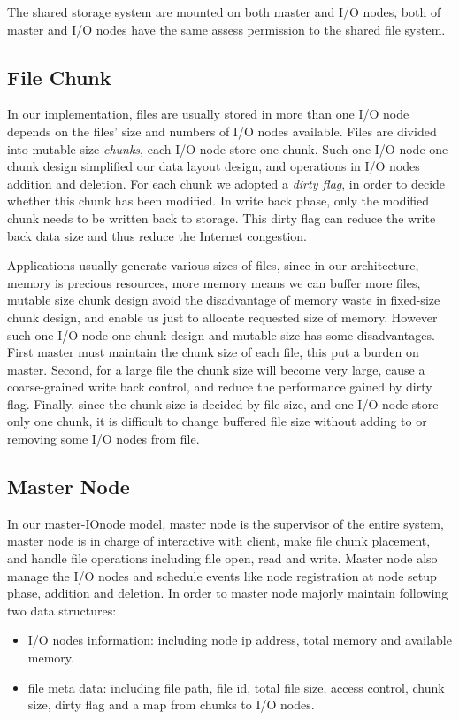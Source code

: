 The shared storage system are mounted on both master and I/O nodes, both of master and I/O nodes
have the same assess permission to the shared file system.

\subsection{File Chunk}
In our implementation, files are usually stored in more than one I/O node depends on the files'
size and numbers of I/O nodes available.
Files are divided into mutable-size \emph{chunks}, each I/O node store one chunk.
Such one I/O node one chunk design simplified our data layout design, and operations in I/O nodes addition and deletion.
For each chunk we adopted a \emph{dirty flag}, in order to decide whether this chunk has been modified.
In write back phase, only the modified chunk needs to be written back to storage.
This dirty flag can reduce the write back data size and thus reduce the Internet congestion.

Applications usually generate various sizes of files, since in our architecture, memory is precious
resources, more memory means we can buffer more files, mutable size chunk design avoid the
disadvantage of memory waste in fixed-size chunk design, and enable us just to allocate requested size of memory.
However such one I/O node one chunk design and mutable size has some disadvantages.
First master must maintain the chunk size of each file, this put a burden on master.
Second, for a large file the chunk size will become very large, cause a coarse-grained write back
control, and reduce the performance gained by dirty flag.
Finally, since the chunk size is decided by file size, and one I/O node store only one chunk, it is
difficult to change buffered file size without adding to or removing some I/O nodes from file.

\subsection{Master Node}
In our master-IOnode model, master node is the supervisor of the entire system,
master node is in charge of interactive with client, make file chunk placement, and handle file operations including file open, read and write.
Master node also manage the I/O nodes and schedule events like node registration at node setup phase, addition and deletion.
In order to master node majorly maintain following two data structures:
\begin{itemize}
  \item I/O nodes information: including node ip address, total memory and available memory.
  \item file meta data: including file path, file id, total file size, access control, chunk size,
  dirty flag and a map from chunks to I/O nodes.
\end{itemize}

